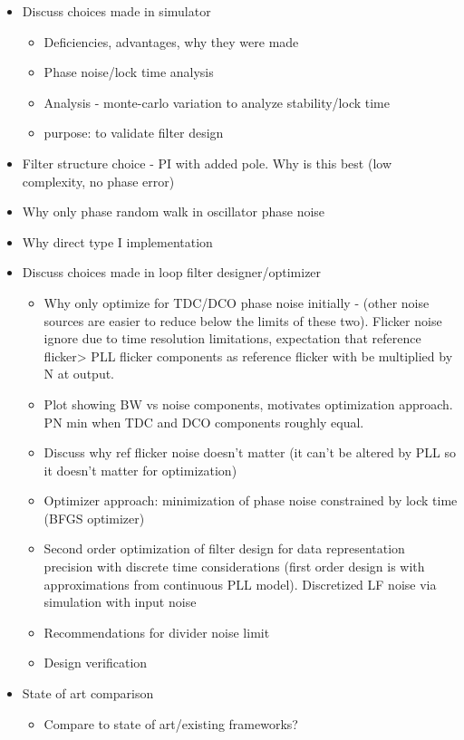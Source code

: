 \begin{itemize}
	\item Discuss choices made in simulator
	\begin{itemize}
		\item Deficiencies, advantages, why they were made
		\item Phase noise/lock time analysis
		\item Analysis - monte-carlo variation to analyze stability/lock time
		\item purpose: to validate filter design
	\end{itemize}
	\item Filter structure choice - PI with added pole. Why is this best (low complexity, no phase error)
	\item Why only phase random walk in oscillator phase noise
	\item Why direct type I implementation
	\item Discuss choices made in loop filter designer/optimizer
	\begin{itemize}
		\item Why only optimize for TDC/DCO phase noise initially - (other noise sources are easier to reduce below the limits of these two). Flicker noise ignore due to time resolution limitations, expectation that reference flicker> PLL flicker components as reference flicker with be multiplied by N at output.
		\item Plot showing BW vs noise components, motivates optimization approach. PN min when TDC and DCO components roughly equal.
		\item Discuss why ref flicker noise doesn't matter (it can't be altered by PLL so it doesn't matter for optimization)
		\item Optimizer approach: minimization of phase noise constrained by lock time (BFGS optimizer)
		\item Second order optimization of filter design for data representation precision with discrete time considerations (first order design is with approximations from continuous PLL model). Discretized LF noise via simulation with input noise
		\item Recommendations for divider noise limit
		\item Design verification
	\end{itemize}
	\item State of art comparison
	\begin{itemize}
		\item Compare to state of art/existing frameworks?

\end{itemize}
\end{itemize}

